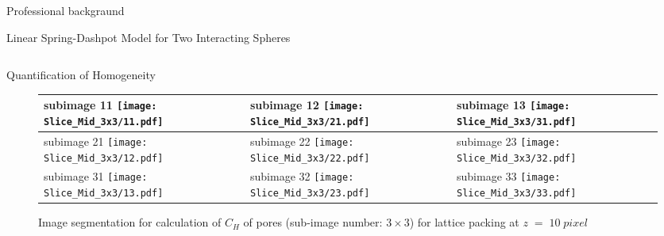 \documentclass[10pt,xcolor=dvipsnames]{beamer}
\begin{document}
{\begin{frame}{Professional backgraund}
{\begin{frame} {Linear Spring-Dashpot Model for Two Interacting Spheres}
\begin{columns}[T,onlytextwidth]
\end{columns}
\end{frame}
}


{
\usenavigationsymbolstemplate{}

\begin{frame}{Quantification of Homogeneity}
\begin{figure}[H]
\centering
\begin{tabular}{ p{2.3cm} | p{2.3cm} | p{2.3cm}}
subimage 11 \newline 
\texttt{[image: Slice\_Mid\_3x3/11.pdf]}
&
subimage 12 \newline 
\texttt{[image: Slice\_Mid\_3x3/21.pdf]} 
&
subimage 13 \newline 
\texttt{[image: Slice\_Mid\_3x3/31.pdf]} \\\hline 
subimage 21 \newline 
\texttt{[image: Slice\_Mid\_3x3/12.pdf]}
&
subimage 22 \newline 
\texttt{[image: Slice\_Mid\_3x3/22.pdf]} 
&
subimage 23 \newline 
\texttt{[image: Slice\_Mid\_3x3/32.pdf]}  \\\hline 
subimage 31 \newline 
\texttt{[image: Slice\_Mid\_3x3/13.pdf]} 
&
subimage 32 \newline 
\texttt{[image: Slice\_Mid\_3x3/23.pdf]} 
&
subimage 33 \newline 
\texttt{[image: Slice\_Mid\_3x3/33.pdf]} \\\hline 
\end{tabular}
	\caption{Image segmentation for calculation of $C_{H}$ of pores (sub-image number: $3 \times 3$) for lattice packing at $z\;=\;10\;pixel$ }
	\label{tab:imagesegmentationLattice}
\end{figure}
\end{frame}
}



\end{frame}}
\end{document}
